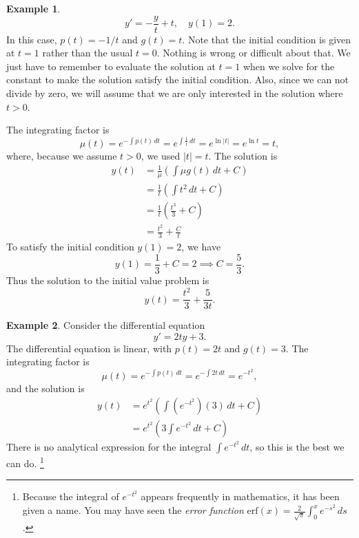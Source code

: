 \documentclass[reqno]{immbook}
\numberwithin{equation}{chapter}
\numberwithin{question}{section}
\numberwithin{theorem}{chapter}
\numberwithin{figure}{chapter}
\theoremstyle{definition}
\newtheorem{example}{Example}[section]
\begin{document}
\begin{example}
\begin{equation}
   y' = -\frac{y}{t} + t, \quad y(1) = 2.
\end{equation}
In this case, $p(t) = -1/t$ and $g(t) = t$.
Note that the initial condition is given at
$t=1$ rather than the usual $t=0$.  Nothing
is wrong or difficult about that. We just have
to remember to evaluate the solution at $t=1$
when we solve for the constant to make
the solution satisfy the initial condition.
Also, since we can not divide by zero, we will
assume that we are only interested in the solution
where $t > 0$.

The integrating factor is
\begin{equation}
   \mu(t) = e^{-\int p(t)\,dt} = e^{\int \frac{1}{t}\, dt}
      = e^{\ln |t|} = e^{\ln t} = t,
\end{equation}
where, because we assume $t>0$,  we used $|t|=t$.
The solution is
\begin{equation}
\begin{split}
   y(t) & = \frac{1}{\mu} \left( \int \mu g(t)\,dt + C\right) \\
        & = \frac{1}{t} \left( \int t^2 \,dt+C\right) \\
	& = \frac{1}{t} \left( \frac{t^3}{3} + C \right)\\
	& = \frac{t^2}{3} + \frac{C}{t}
\end{split}
\end{equation}
To satisfy the initial condition $y(1)=2$, we have
\begin{equation}
   y(1) = \frac{1}{3} + C = 2 \implies C = \frac{5}{3}.
\end{equation}
Thus the solution to the initial value problem is
\begin{equation}
   y(t) = \frac{t^2}{3} + \frac{5}{3t}.
\end{equation}
\end{example}

\begin{example}
Consider the differential equation
\begin{equation}
    y' = 2ty + 3.
\end{equation}
The differential equation is linear, with $p(t) = 2t$ and $g(t)=3$.
The integrating factor is
\begin{equation}
   \mu(t) = e^{-\int p(t)\,dt} = e^{-\int 2t\, dt}
      = e^{-t^2},
\end{equation}
and the solution is
\begin{equation}
\begin{split}
   y(t) & = e^{t^2} \left( \int \left(e^{-t^2}\right)\left(3\right)\,dt + C\right) \\
        & = e^{t^2} \left( 3\int e^{-t^2}\,dt+C\right)
\end{split}
\end{equation}
There is no analytical expression for the integral $\int e^{-t^2}\, dt$,
so this is the best we can do.%
\footnote{%
Because the integral of $e^{-t^2}$ appears frequently in mathematics,
it has been given a name.
You may have seen the \emph{error function}
$\textrm{erf}(x) = \frac{2}{\sqrt{\pi}}\int_0^x e^{-s^2}\,ds$.}
\end{example}
\end{document}
